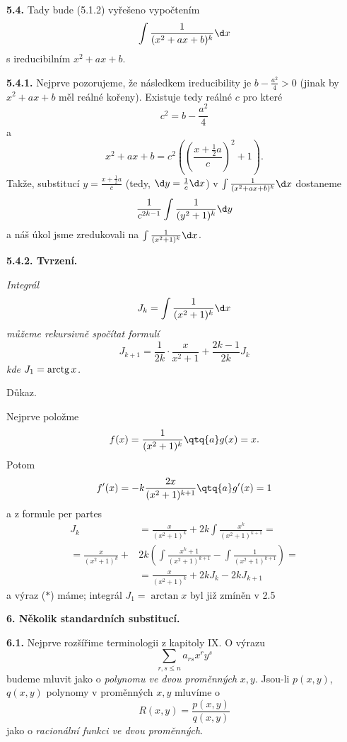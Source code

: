 \documentclass[12pt]{article}
\begin{document}
{  \bigskip
  
  {\bf 5.4.} Tady bude (5.1.2) vyřešeno vypočtením
  $$
  \int\frac{1}{(x^2+ax+b)^k}\d x
  $$
  s ireducibilním $x^2+ax+b$.
  
  \medskip
  
  {\bf 5.4.1.} Nejprve pozorujeme, že následkem ireducibility je $b-\frac{a^2}{4}>0$ (jinak by
  $x^2+ax+b$ měl reálné kořeny). Existuje tedy reálné $c$ pro které
  $$
  c^2=b-\frac{a^2}{4}
  $$
  a
  $$
  x^2+ax+b=c^2\left(\left(\frac{x+\frac12 a}{c}\right)^2+1\right).
  $$
  Takže, substitucí $y=\frac{x+\frac12 a}{c}$ (tedy, $\d y= \frac{1}{c}\d x$) v $
  \int\frac{1}{(x^2+ax+b)^k}\d x
  $ dostaneme
  $$
  \frac{1}{c^{2k-1}}\int\frac{1}{(y^2+1)^k}\d y
  $$
 a náš úkol jsme zredukovali na $\int\frac{1}{(x^2+1)^k}\d x$.
  
  \medskip
  
  {\bf 5.4.2. Tvrzení.} {\em Integrál
  $$
  J_k=\int\frac{1}{(x^2+1)^k}\d x
  $$
  můžeme rekursivně spočítat formulí
  \begin{equation}
  J_{k+1}=\frac{1}{2k}\cdot \frac{x}{x^2+1}+\frac{2k-1}{2k}J_k \tag{$*$}
  \end{equation}
  kde $J_1=\text{\rm arctg}\, x$.
  
  Důkaz.} Nejprve položme
  $$
  f(x)=\frac{1}{(x^2+1)^k}\qtq{a} g(x)=x.
  $$
  Potom
  $$
  f'(x)=-k\frac{2x}{(x^2+1)^{k+1}}\qtq{a} g'(x)=1
  $$
 a z formule per partes
  $$
  \begin{aligned}
  J_k&=\frac{x}{(x^2+1)^{k}}+2k\int\frac{x^k}{(x^2+1)^{k+1}}=\\
  =\frac{x}{(x^2+1)^{k}}+&2k\left(\int\frac{x^k+1}{(x^2+1)^{k+1}}-\int\frac{1}{(x^2+1)^{k+1}}\right)=\\
  &=\frac{x}{(x^2+1)^{k}}+2kJ_k-2kJ_{k+1}
  \end{aligned}
  $$
  a výraz ($*$) máme; integrál $J_1=\arctan x$ byl již zmíněn v 2.5 \sq
  
   
 \vskip10mm
 
 {\large\bf 6. Několik standardních substitucí.}
 
  
 \bigskip
 
 {\bf 6.1.} Nejprve rozšířime terminologii z kapitoly IX. O výrazu
 $$
 \sum_{r,s\leq n}a_{rs}x^ry^s
 $$
 budeme mluvit jako o {\em polynomu ve dvou proměnných} $x,y$. Jsou-li $p(x,y)$, $q(x,y)$ polynomy v proměnných $x,y$ mluvíme o
 $$
 R(x,y)=\frac{p(x,y)}{q(x,y)}
 $$
jako o {\em racionální funkci ve dvou proměnných}.
 
 \medskip
 
}
\end{document}
